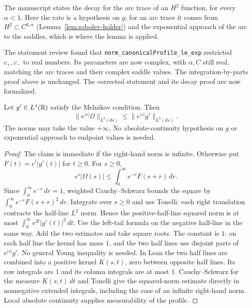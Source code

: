 \begin{remark}
The manuscript states the decay for the arc trace of an $H^2$ function, for every
$\alpha<1$. Here the rate is a hypothesis on $g$; for an arc trace it comes from
$H^2\subset C^{0,\alpha}$ (Lemma~\ref{lem:sobolev-holder}) and the exponential
approach of the arc to the saddles, which is where the lemma is applied.
\end{remark}

\begin{remark}
The statement review found that \texttt{norm\_canonicalProfile\_le\_exp} restricted
$c_+,c_-$ to real numbers. Its parameters are now complex, with $\alpha,C$ still real,
matching the arc traces and their complex saddle values. The integration-by-parts
proof above is unchanged. The corrected statement and its decay proof are now formalized.
\end{remark}

\begin{lemma}
\label{lem:canonical-profile-weighted}
\leanok
Let $g'\in L^1(\mathbb{R})$ satisfy the Melnikov condition. Then
\[
  \|e^{|s|}\Omega\|_{L^2(ds)}\le\|e^{|s|}g'\|_{L^2(ds)}.
\]
The norms may take the value $+\infty$. No absolute-continuity hypothesis on $g$
or exponential approach to endpoint values is needed.
\end{lemma}

\begin{proof}
\leanok
The claim is immediate if the right-hand norm is infinite.
Otherwise put $F(t)=e^t|g'(t)|$ for $t\ge0$. For $s\ge0$,
\[
  e^s|\Omega(s)|\le\int_0^\infty e^{-r}F(s+r)\,dr .
\]
Since $\int_0^\infty e^{-r}\,dr=1$, weighted Cauchy--Schwarz bounds the
square by $\int_0^\infty e^{-r}F(s+r)^2\,dr$. Integrate over $s\ge0$
and use Tonelli: each right translation contracts the half-line
$L^2$ norm. Hence the positive-half-line squared norm is at most
$\int_0^\infty e^{2t}|g'(t)|^2\,dt$.
Use the left-tail formula on the negative half-line in the same way.
Add the two estimates and take square roots. The constant is $1$: on each
half line the kernel has mass $1$, and the two half lines use disjoint parts
of $e^{|s|}g'$. No general Young inequality is needed.
In Lean the two half lines are combined into a positive kernel $K(s,t)$,
zero between opposite half lines. Its row integrals are $1$ and its column
integrals are at most $1$. Cauchy--Schwarz for the measure $K(s,t)\,dt$ and
Tonelli give the squared-norm estimate directly in nonnegative extended
integrals, including the case of an infinite right-hand norm. Local absolute
continuity supplies measurability of the profile.
\end{proof}

